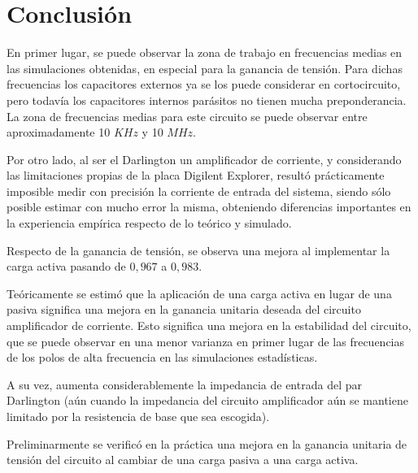 \chapter{Conclusión}
En primer lugar, se puede observar la zona de trabajo en frecuencias medias en las simulaciones obtenidas, en especial para la 
ganancia de tensión. Para dichas frecuencias los capacitores externos ya se los puede considerar en cortocircuito, pero todavía los capacitores 
internos parásitos no tienen mucha preponderancia. La zona de frecuencias medias para este circuito se puede observar entre aproximadamente 
10 $KHz$ y 10 $MHz$. \par 

Por otro lado, al ser el Darlington un amplificador de corriente, y considerando las limitaciones propias de la placa Digilent Explorer,
 resultó prácticamente imposible medir con precisión la corriente de entrada del  sistema, siendo sólo posible estimar con mucho error la misma,
  obteniendo diferencias importantes en la experiencia empírica respecto de
 lo teórico y simulado. \par 

 Respecto de la ganancia de tensión, se observa una mejora al implementar la carga activa pasando de $0,967$ a $0,983$.

Teóricamente se estimó que la aplicación de una carga activa en lugar de una pasiva significa una mejora en la ganancia unitaria 
deseada del circuito amplificador de corriente. Esto significa una mejora en la estabilidad del circuito, que se puede observar en una menor varianza en primer lugar de las frecuencias de los polos de alta frecuencia en las simulaciones estadísticas.

A su vez, aumenta considerablemente la impedancia de entrada del par Darlington (aún cuando la impedancia del circuito amplificador aún se mantiene limitado por la resistencia de base que sea escogida).

Preliminarmente se verificó en la práctica una mejora en la ganancia unitaria de tensión del circuito al cambiar de una carga pasiva a una carga activa.